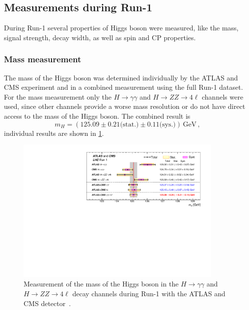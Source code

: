 \subsection{Measurements during Run-1}\label{sub:theory:meas:run1}

During Run-1 several properties of Higgs boson were measured, like the mass, signal strength, decay width, as well as
spin and CP properties.

\subsubsection{Mass measurement}\label{subsub:theory:meas:run1:mass}

The mass of the Higgs boson was determined individually by the ATLAS and CMS experiment and
in a combined measurement using the full Run-1 dataset.
For the mass measurement only the $H\to\gamma\gamma$ and $H\to ZZ \to 4\ell$ channels were used, since other channels
provide a worse mass resolution or do not have direct access to the mass of the Higgs boson.
The combined result is~\cite{MassCombinedMeas}
\begin{equation}
    m_H = (125.09 \pm 0.21 \text{(stat.)} \pm 0.11 \text{(sys.)})\,\text{GeV} \,,
\end{equation}
individual results are shown in \cref{fig:theory:meas:run1:mass}.

\begin{figure}[htb]
    \centering
    \includegraphics[width=0.9\textwidth]{./figures/theory/mass_combination_atlascms.pdf}
    \caption{Measurement of the mass of the Higgs boson in the $H\to\gamma\gamma$ and $H \to ZZ \to 4\ell$ decay channels during Run-1 with the ATLAS and CMS detector~\cite{MassCombinedMeas}.}\label{fig:theory:meas:run1:mass}
\end{figure}

